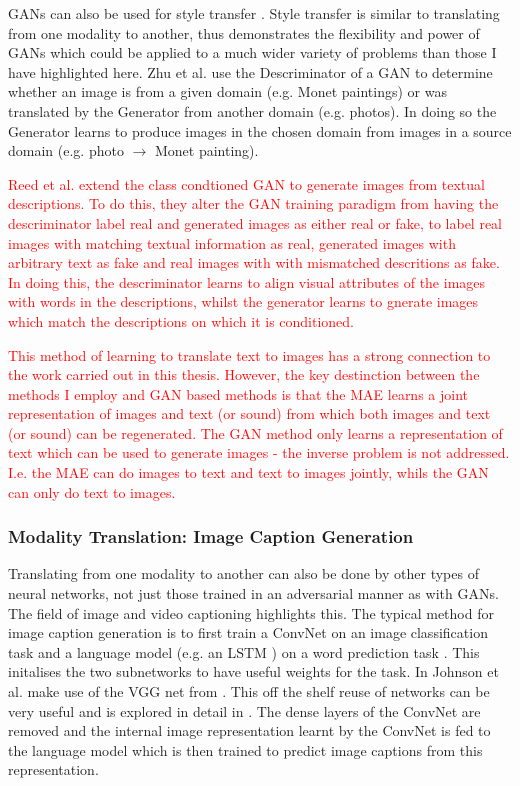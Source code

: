 \acp{GAN} can also be used for style transfer \cite{zhu2017unpaired}. Style transfer is similar to translating from one modality to another, thus \cite{zhu2017unpaired} demonstrates the flexibility and power of \acp{GAN} which could be applied to a much wider variety of problems than those I have highlighted here. Zhu et al. use the Descriminator of a \ac{GAN} to determine whether an image is from a given domain (e.g. Monet paintings) or was translated by the Generator from another domain (e.g. photos). In doing so the Generator learns to produce images in the chosen domain from images in a source domain (e.g. photo $\rightarrow$ Monet painting).

\textcolor{red}{Reed et al. \cite{reed2016generative} extend the class condtioned \ac{GAN} to generate images from textual descriptions. To do this, they alter the \ac{GAN} training paradigm from having the descriminator label real and generated images as either real or fake, to label real images with matching textual information as real, generated images with arbitrary text as fake and real images with with mismatched descritions as fake. In doing this, the descriminator learns to align visual attributes of the images with words in the descriptions, whilst the generator learns to gnerate images which match the descriptions on which it is conditioned.}

\textcolor{red}{This method of learning to translate text to images has a strong connection to the work carried out in this thesis. However, the key destinction between the methods I employ and \ac{GAN} based methods is that the \ac{MAE} learns a joint representation of images and text (or sound) from which both images and text (or sound) can be regenerated. The \ac{GAN} method only learns a representation of text which can be used to generate images - the inverse problem is not addressed. I.e. the \ac{MAE} can do images to text and text to images jointly, whils the \ac{GAN} can only do text to images.}

\subsubsection{Modality Translation: Image Caption Generation}
Translating from one modality to another can also be done by other types of neural networks, not just those trained in an adversarial manner as with \acp{GAN}.
The field of image and video captioning highlights this. The typical method for image caption generation is to first train a \ac{ConvNet} on an image classification task and a language model (e.g. an \ac{LSTM} \cite{hochreiter1997long}) on a word prediction task \cite{vinyals2015show, venugopalan2014translating, johnson2016densecap}. This initalises the two subnetworks to have useful weights for the task. In \cite{johnson2016densecap} Johnson et al. make use of the VGG net from \cite{simonyan2014very}. This off the shelf reuse of networks can be very useful and is explored in detail in \cite{keller}.
The dense layers of the \ac{ConvNet} are removed and the internal image representation learnt by the \ac{ConvNet} is fed to the language model which is then trained to predict image captions from this representation.

